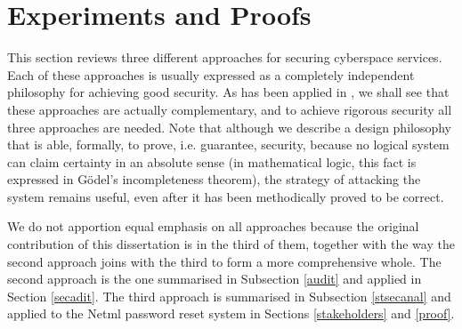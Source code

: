 \section{Experiments and Proofs}

This section reviews three different approaches for securing cyberspace services. Each of these approaches is usually expressed as a completely independent philosophy for achieving good security. As has been applied in \cite{sheniar2018experiments}, we shall see that these approaches are actually complementary, and to achieve rigorous security all three approaches are needed. Note that although we describe a design philosophy that is able, formally, to prove, i.e. guarantee, security, because no logical system can claim certainty in an absolute sense (in mathematical logic, this fact is expressed in G\"odel's incompleteness theorem), the strategy of attacking the system remains useful, even after it has been methodically proved to be correct.

We do not apportion equal emphasis on all approaches because the original contribution of this dissertation is in the third of them, together with the way the second approach joins with the third to form a more comprehensive whole. The second approach is the one summarised in Subsection \ref{audit} and applied in Section \ref{secadit}. The third approach is summarised in Subsection \ref{stsecanal} and applied to the Netml password reset system in Sections \ref{stakeholders} and \ref{proof}.


